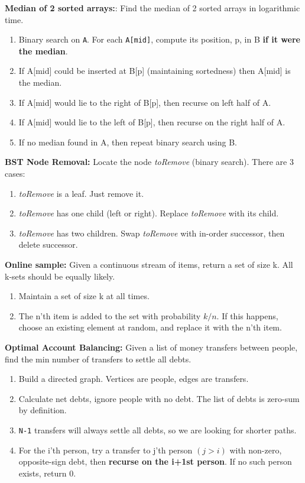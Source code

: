 \documentclass[12pt]{article}
\begin{document}
\vspace{5mm}
\noindent
\textbf{Median of 2 sorted arrays:}: Find the median of 2 sorted arrays in logarithmic time.
\begin{enumerate}
\item Binary search on \texttt{A}. For each \texttt{A[mid]}, compute its position, p, in B \textbf{if it were the median}.
\item If A[mid] could be inserted at B[p] (maintaining sortedness) then A[mid] is the median.
\item If A[mid] would lie to the right of B[p], then recurse on left half of A.
\item If A[mid] would lie to the left of B[p], then recurse on the right half of A.
\item If no median found in A, then repeat binary search using B.
\end{enumerate}


\vspace{5mm}
\noindent
\textbf{BST Node Removal:}
Locate the node \emph{toRemove} (binary search). There are 3 cases:
\begin{enumerate}
\item \emph{toRemove} is a leaf. Just remove it.
\item \emph{toRemove} has one child (left or right). Replace \emph{toRemove} with its child. 
\item \emph{toRemove} has two children. Swap \emph{toRemove} with in-order successor, then delete successor.
\end{enumerate}


\vspace{5mm}
\noindent
\textbf{Online sample:}
Given a continuous stream of items, return a set of size k. All k-sets should be equally likely.
\begin{enumerate}
\item Maintain a set of size k at all times.
\item The n'th item is added to the set with probability $k/n$. If this happens, choose an existing element at random, and replace it with the n'th item. 
\end{enumerate}


\vspace{5mm}
\noindent
\textbf{Optimal Account Balancing:}
Given a list of money transfers between people, find the min number of transfers to settle all debts.
\begin{enumerate}
\item Build a directed graph. Vertices are people, edges are transfers.
\item Calculate net debts, ignore people with no debt. The list of debts is zero-sum by definition.
\item \texttt{N-1} transfers will always settle all debts, so we are looking for shorter paths.
\item For the i'th person, try a transfer to j'th person $(j > i)$ with non-zero, opposite-sign debt, then \textbf{recurse on the i+1st person}. If no such person exists, return 0.
\end{enumerate}
\end{document}

